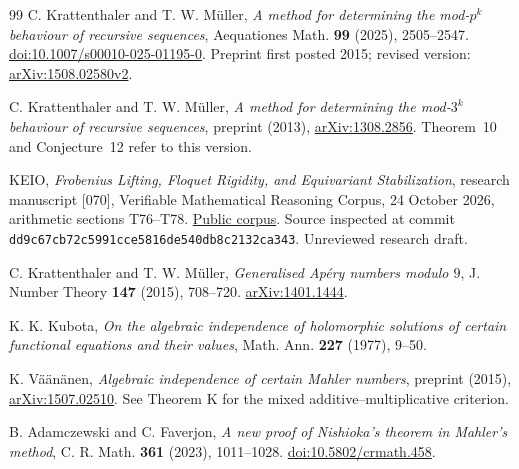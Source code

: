 \begin{thebibliography}{99}
C. Krattenthaler and T. W. M\"uller,
\emph{A method for determining the mod-$p^k$ behaviour of recursive sequences},
Aequationes Math. \textbf{99} (2025), 2505--2547.
\href{https://doi.org/10.1007/s00010-025-01195-0}{doi:10.1007/s00010-025-01195-0}.
Preprint first posted 2015; revised version:
\href{https://arxiv.org/abs/1508.02580v2}{arXiv:1508.02580v2}.

C. Krattenthaler and T. W. M\"uller,
\emph{A method for determining the mod-$3^k$ behaviour of recursive sequences},
preprint (2013),
\href{https://arxiv.org/abs/1308.2856}{arXiv:1308.2856}.
Theorem~10 and Conjecture~12 refer to this version.

KEIO,
\emph{Frobenius Lifting, Floquet Rigidity, and Equivariant Stabilization},
research manuscript [070], Verifiable Mathematical Reasoning Corpus,
24 October 2026, arithmetic sections T76--T78.
\href{https://github.com/QEEDDD/Verifiable-Mathematical-Reasoning-Corpus}{Public corpus}.
Source inspected at commit \texttt{dd9c67cb72c5991cce5816de540db8c2132ca343}.
Unreviewed research draft.

C. Krattenthaler and T. W. M\"uller,
\emph{Generalised Ap\'ery numbers modulo $9$},
J. Number Theory \textbf{147} (2015), 708--720.
\href{https://arxiv.org/abs/1401.1444}{arXiv:1401.1444}.

K. K. Kubota,
\emph{On the algebraic independence of holomorphic solutions of certain
functional equations and their values},
Math. Ann. \textbf{227} (1977), 9--50.

K. V\"a\"an\"anen,
\emph{Algebraic independence of certain Mahler numbers},
preprint (2015),
\href{https://arxiv.org/abs/1507.02510}{arXiv:1507.02510}.
See Theorem K for the mixed additive--multiplicative criterion.

B. Adamczewski and C. Faverjon,
\emph{A new proof of Nishioka's theorem in Mahler's method},
C. R. Math. \textbf{361} (2023), 1011--1028.
\href{https://doi.org/10.5802/crmath.458}{doi:10.5802/crmath.458}.
\end{thebibliography}

